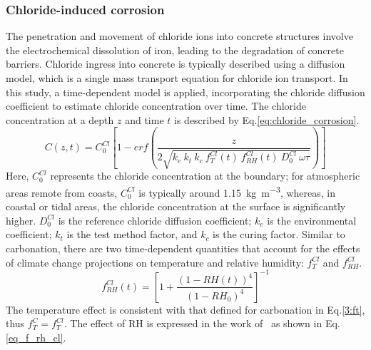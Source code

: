 \subsubsection{Chloride-induced corrosion}\label{Chloride_corrosion_Chpt}
The penetration and movement of chloride ions into concrete structures involve the electrochemical dissolution of iron, leading to the degradation of concrete barriers.
Chloride ingress into concrete is typically described using a diffusion model, which is a single mass transport equation for chloride ion transport.
In this study, a time-dependent model is applied, incorporating the chloride diffusion coefficient to estimate chloride concentration over time. The chloride concentration at a depth $z$ and time $t$ is described by Eq.\ref{eq:chloride_corrosion}.
\begin{equation}
    \label{eq:chloride_corrosion}
    C(z, t) = C_0^{Cl} \left[ 1-erf \left(\frac{z}{2\sqrt{k_e \ k_t \ k_c \ f_T^{Cl}(t) \ f_{RH}^{Cl}(t) \ D_0^{Cl} \ \omega \tau}} \right) \right]
\end{equation}
Here, $C_0^{Cl}$ represents the chloride concentration at the boundary; for atmospheric areas remote from coasts, $C_0^{Cl}$ is typically around \SI{1.15}{\kilogram\per\cubic\meter}, whereas, in coastal or tidal areas, the chloride concentration at the surface is significantly higher. $D_0^{Cl}$ is the reference chloride diffusion coefficient; $k_e$ is the environmental coefficient; $k_t$ is the test method factor, and $k_c$ is the curing factor. 
Similar to carbonation, there are two time-dependent quantities that account for the effects of climate change projections on temperature and relative humidity: $f_{T}^{Cl}$ and $f_{RH}^{Cl}$.
\begin{equation}
    \label{eq_f_rh_cl}
    f_{RH}^{Cl}(t) = \left[ 1 + \frac{(1-RH(t))^4}{(1-RH_0)^4} \right]^{-1}
\end{equation}
The temperature effect is consistent with that defined for carbonation in Eq.\ref{3:ft}, thus $f_T^C = f_T^{Cl}$. The effect of RH is expressed in the work of~\textcite{f_RH_ClELHASSAN} as shown in Eq.\ref{eq_f_rh_cl}.

